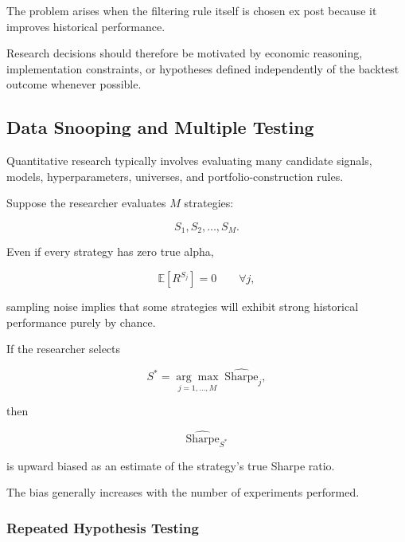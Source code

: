 \documentclass[11pt,a4paper]{article}
\begin{document}
The problem arises when the filtering rule itself is chosen ex post because it
improves historical performance.

Research decisions should therefore be motivated by economic reasoning,
implementation constraints, or hypotheses defined independently of the
backtest outcome whenever possible.


\subsection{Data Snooping and Multiple Testing}
\label{subsec:data_snooping}

Quantitative research typically involves evaluating many candidate signals,
models, hyperparameters, universes, and portfolio-construction rules.

Suppose the researcher evaluates $M$ strategies:

\begin{equation}
S_1,
S_2,
\ldots,
S_M.
\end{equation}

Even if every strategy has zero true alpha,

\begin{equation}
\mathbb{E}[R^{S_j}]=0
\qquad
\forall j,
\end{equation}

sampling noise implies that some strategies will exhibit strong historical
performance purely by chance.

If the researcher selects

\begin{equation}
S^*
=
\underset{j=1,\ldots,M}{\arg\max}
\;
\widehat{\mathrm{Sharpe}}_j,
\end{equation}

then

\begin{equation}
\widehat{\mathrm{Sharpe}}_{S^*}
\end{equation}

is upward biased as an estimate of the strategy's true Sharpe ratio.

The bias generally increases with the number of experiments performed.


\subsubsection{Repeated Hypothesis Testing}
\end{document}
